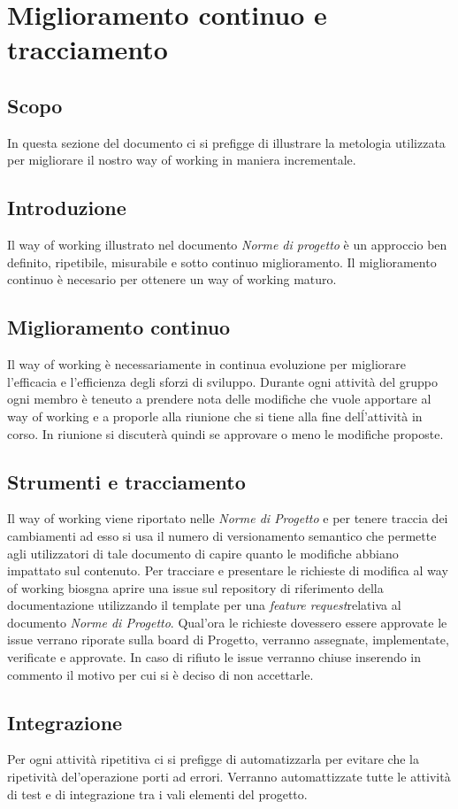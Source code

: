 \section{Miglioramento continuo e tracciamento}

\subsection{Scopo}
In questa sezione del documento ci si prefigge di illustrare la metologia utilizzata
per migliorare il nostro way of working in maniera incrementale.

\subsection{Introduzione}
Il way of working illustrato nel documento \textit{Norme di progetto} è un approccio
ben definito, ripetibile, misurabile e sotto continuo miglioramento.
Il miglioramento continuo è necesario per ottenere un way of working maturo.

\subsection{Miglioramento continuo}
Il way of working è necessariamente in continua evoluzione per migliorare l'efficacia
e l'efficienza degli sforzi di sviluppo.
Durante ogni attività del gruppo ogni membro è teneuto a prendere nota delle modifiche
che vuole apportare al way of working e a proporle alla riunione che si tiene alla
fine delĺ'attività in corso.
In riunione si discuterà quindi se approvare o meno le modifiche proposte.
\subsection{Strumenti e tracciamento}
Il way of working viene riportato nelle \textit{Norme di Progetto}%
e per tenere traccia dei cambiamenti ad esso si usa il numero di versionamento semantico
che permette agli utilizzatori di tale documento di capire quanto le modifiche abbiano
impattato sul contenuto.
Per tracciare e presentare le richieste di modifica al way of working biosgna aprire
una issue sul repository di riferimento della documentazione utilizzando il template
per una \textit{feature request}\glo relativa al documento \textit{Norme di Progetto}.
Qual'ora le richieste dovessero essere approvate le issue verrano riporate sulla
board di Progetto, verranno assegnate, implementate, verificate e approvate.
In caso di rifiuto le issue verranno chiuse inserendo in commento il motivo per cui
si è deciso di non accettarle.

\subsection{Integrazione}
Per ogni attività ripetitiva ci si prefigge di automatizzarla per evitare che la
ripetività del'operazione porti ad errori.
Verranno automattizzate tutte le attività di test e di integrazione tra i vali
elementi del progetto.
